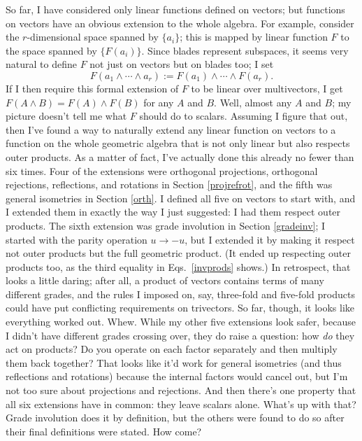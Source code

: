 \documentclass{utarticle}
\DeclareMathOperator{\out}{\wedge}
\begin{document}
So far, I have considered only linear functions defined on vectors; but functions on
vectors have an obvious extension to the whole algebra.  For example, consider the
$r$-dimensional space spanned by $\{a_i\}$; this is mapped by linear function $F$ to 
the space spanned by $\{F(a_i)\}$.  Since blades represent subspaces, it seems very 
natural to define $F$ not just on vectors but on blades too; I set 
\begin{equation} F(a_1\out \dotsb \out a_r) := F(a_1) \out \dotsb \out F(a_r). \end{equation}
If I then require this formal extension of $F$ to be linear over multivectors, I get  
$F(A \out B) = F(A) \out F(B)$ for any $A$ and $B$.  Well, almost any $A$ and $B$; my 
picture doesn't tell me what $F$ should do to scalars.  Assuming I figure that out, 
then I've found a way to naturally extend any linear function on vectors to a function on 
the whole geometric algebra that is not only linear but also respects outer products.  As a 
matter of fact, I've actually done this already no fewer than six times.   Four of the 
extensions were orthogonal projections, orthogonal rejections, reflections, and rotations 
in Section \ref{projrefrot}, and the fifth was general isometries in Section \ref{orth}.  
I defined all five on vectors to start with, and I extended them in exactly the way I just 
suggested: I had them respect outer products.  The sixth extension was grade involution 
in Section \ref{gradeinv}; I started with the parity operation $u \rightarrow -u$, but I extended it 
by making it respect not outer products but the full geometric product.  (It ended up 
respecting outer products too, as the third equality in Eqs.~\eqref{invprods} shows.)  
In retrospect, that looks a little daring; after all, a product of vectors contains terms of 
many different grades, and the rules I imposed on, say, three-fold and five-fold products
could have put conflicting requirements on trivectors.  So far, though, it looks like everything 
worked out.  Whew.  While my other five extensions look safer, because I didn't have 
different grades crossing over, they do raise a question: how \emph{do} they act
on products?  Do you operate on each factor separately and then multiply them back together?
That looks like it'd work for general isometries (and thus reflections and rotations) because 
the internal factors would cancel out, but I'm not too sure about projections and rejections.  
And then there's one property that all six extensions have in common: they leave scalars 
alone.  What's up with that?  Grade involution does it by definition, but the others were 
found to do so after their final definitions were stated.  How come?
\end{document}
